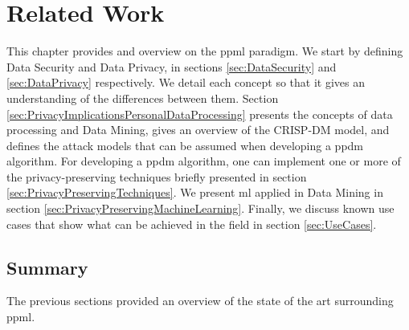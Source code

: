 %

\acresetall

\chapter{Related Work}
\label{ch:RelatedWork}


This chapter provides and overview on the \ac{ppml} paradigm.
We start by defining Data Security and Data Privacy, in sections \ref{sec:DataSecurity} and \ref{sec:DataPrivacy} respectively. We detail each concept so that it gives an understanding of the differences between them.
Section \ref{sec:PrivacyImplicationsPersonalDataProcessing} presents the concepts of data processing and Data Mining, gives an overview of the CRISP-DM model, and defines the attack models that can be assumed when developing a \ac{ppdm} algorithm.
For developing a \ac{ppdm} algorithm, one can implement one or more of the privacy-preserving techniques briefly presented in section \ref{sec:PrivacyPreservingTechniques}. 
We present \ac{ml} applied in Data Mining in section \ref{sec:PrivacyPreservingMachineLearning}. Finally, we discuss known use cases that show what can be achieved in the field in section \ref{sec:UseCases}.









\section{Summary}
\label{sec:SummaryRelatedWork}

The previous sections provided an overview of the state of the art surrounding \ac{ppml}.

